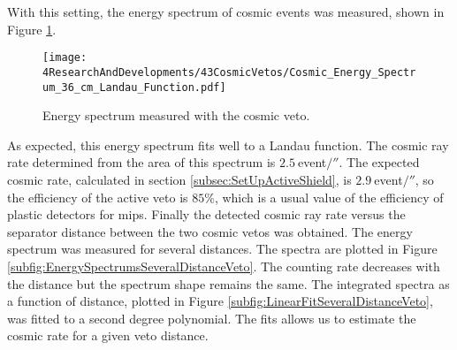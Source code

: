 With this setting, the energy spectrum of cosmic events was measured, shown in Figure \ref{fig:EnergySpectrumCosmicVeto}. 
\begin{figure}[h]
\centering
\texttt{[image: 4ResearchAndDevelopments/43CosmicVetos/Cosmic\_Energy\_Spectrum\_36\_cm\_Landau\_Function.pdf]}
\caption{Energy spectrum measured with the cosmic veto.\label{fig:EnergySpectrumCosmicVeto}}
\end{figure}
As expected, this energy spectrum fits well to a Landau function. The cosmic ray rate determined from the area of this spectrum is $2.5~$event$/\second$. The expected cosmic rate, calculated in section \ref{subsec:SetUpActiveShield}, is $2.9~$event$/\second$, so the efficiency of the active veto is $85\%$, which is a usual value of the efficiency of plastic detectors for mips. Finally the detected cosmic ray rate versus the separator distance between the two cosmic vetos was obtained. The energy spectrum was measured for several distances. The spectra are plotted in Figure \ref{subfig:EnergySpectrumsSeveralDistanceVeto}. The counting rate decreases with the distance but the spectrum shape remains the same. The integrated spectra as a function of distance, plotted in Figure \ref{subfig:LinearFitSeveralDistanceVeto}, was fitted to a second degree polynomial. The fits allows us to estimate the cosmic rate for a given veto distance.





